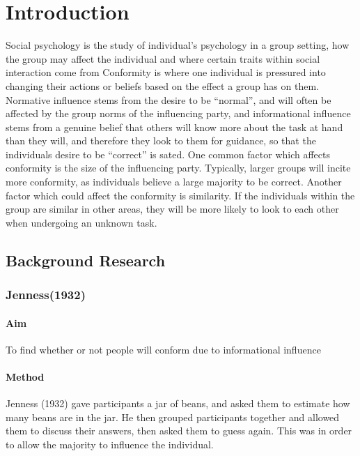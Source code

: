 \documentclass{report}
\begin{document}
\maketitle
\tableofcontents
\chapter{Introduction}
Social psychology is the study of individual’s psychology in a group setting,  how the group may affect the individual and where certain traits within social interaction come from Conformity is where one individual is pressured into changing their actions or beliefs based on the effect a group has on them. Normative influence stems from the desire to be “normal”, and will often be affected by the group norms of the influencing party, and informational influence stems from a genuine belief that others will know more about the task at hand than they will, and therefore they look to them for guidance, so that the individuals desire to be “correct” is sated. One common factor which affects conformity is the size of the influencing party. Typically, larger groups will incite more conformity, as individuals believe a large majority to be correct. Another factor which could affect the conformity is similarity. If the individuals within the group are similar in other areas, they will be more likely to look to each other when undergoing an unknown task.

\section{Background Research}

\subsection{Jenness(1932)}
\subsubsection{Aim}
To find whether or not people will conform due to informational influence
\subsubsection{Method}
Jenness (1932) gave participants a jar of beans, and asked them to estimate how many beans are in the jar. He then grouped participants together and allowed them to discuss their answers, then asked them to guess again. This was in order to allow the majority to influence the individual.
\end{document}
